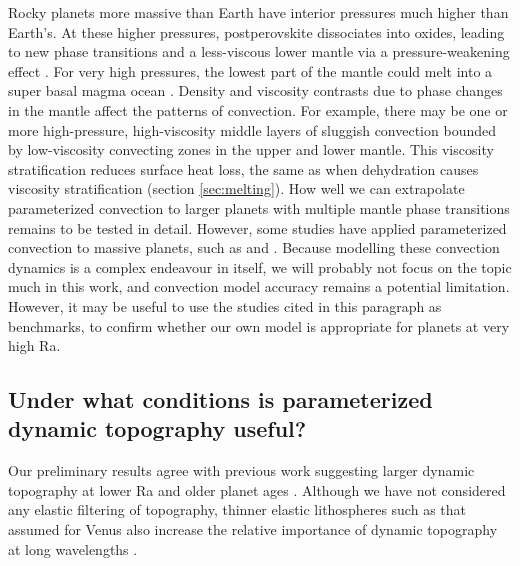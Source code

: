 Rocky planets more massive than Earth have interior pressures much higher than Earth's. At these higher pressures, postperovskite dissociates into oxides, leading to new phase transitions \citep[up to four, meaning a five-layered mantle;][]{vandenBerg2019} and a less-viscous lower mantle via a pressure-weakening effect \citep{Umemoto2011, Karato2011, Tackley2013, Umemoto2017, Shahnas2018, Ritterbex2018, vandenBerg2019}. For very high pressures, the lowest part of the mantle could melt into a super basal magma ocean \citep{Labrosse2007}. Density and viscosity contrasts due to phase changes in the mantle affect the patterns of convection. For example, there may be one or more high-pressure, high-viscosity middle layers of sluggish convection bounded by low-viscosity convecting zones in the upper and lower mantle. This viscosity stratification reduces surface heat loss, the same as when dehydration causes viscosity stratification (section \ref{sec:melting}). How well we can extrapolate parameterized convection to larger planets with multiple mantle phase transitions remains to be tested in detail. However, some studies have applied parameterized convection to massive planets, such as \citet{Kite2009} and \citet{Tosi2017}. 
Because modelling these convection dynamics is a complex endeavour in itself, we will probably not focus on the topic much in this work, and convection model accuracy remains a potential limitation. However, it may be useful to use the studies cited in this paragraph as benchmarks, to confirm whether our own model is appropriate for planets at very high Ra.



\subsection{Under what conditions is parameterized dynamic topography useful?}

Our preliminary results agree with previous work suggesting larger dynamic topography at lower Ra and older planet ages \citep{Breuer2015}. Although we have not considered any elastic filtering of topography, thinner elastic lithospheres such as that assumed for Venus also increase the relative importance of dynamic topography at long wavelengths \citep{Golle2012, Dumoulin2013, Breuer2015}.

